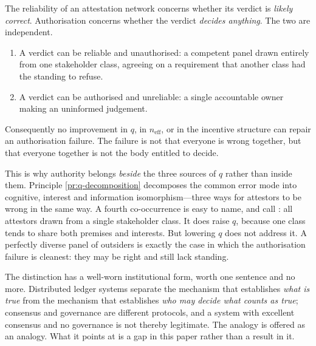 \begin{principle}\label{pr:authority}
The reliability of an attestation network concerns whether its verdict is \emph{likely correct}.
Authorisation concerns whether the verdict \emph{decides anything}. The two are independent.
\begin{enumerate}[label=(\alph*)]
\item A verdict can be reliable and unauthorised: a competent panel drawn entirely from one
      stakeholder class, agreeing on a requirement that another class had the standing to refuse.
\item A verdict can be authorised and unreliable: a single accountable owner making an uninformed
      judgement.
\end{enumerate}
Consequently no improvement in $q$, in $n_{\mathrm{eff}}$, or in the incentive structure can repair an
authorisation failure. The failure is not that everyone is wrong together, but that everyone together
is not the body entitled to decide.
\end{principle}

This is why authority belongs \emph{beside} the three sources of $q$ rather than inside them.
Principle \ref{pr:q-decomposition} decomposes the common error mode into cognitive, interest and
information isomorphism---three ways for attestors to be wrong in the same way. A fourth
co-occurrence is easy to name, and call : all attestors drawn from a
single stakeholder class. It does raise $q$, because one class tends to share both premises and
interests. But lowering $q$ does not address it. A perfectly diverse panel of outsiders is exactly
the case in which the authorisation failure is cleanest: they may be right and still lack standing.

The distinction has a well-worn institutional form, worth one sentence and no more. Distributed
ledger systems separate the mechanism that establishes \emph{what is true} from the mechanism that
establishes \emph{who may decide what counts as true}; consensus and governance are different
protocols, and a system with excellent consensus and no governance is not thereby legitimate. The
analogy is offered as an analogy. What it points at is a gap in this paper rather than a result in it.

